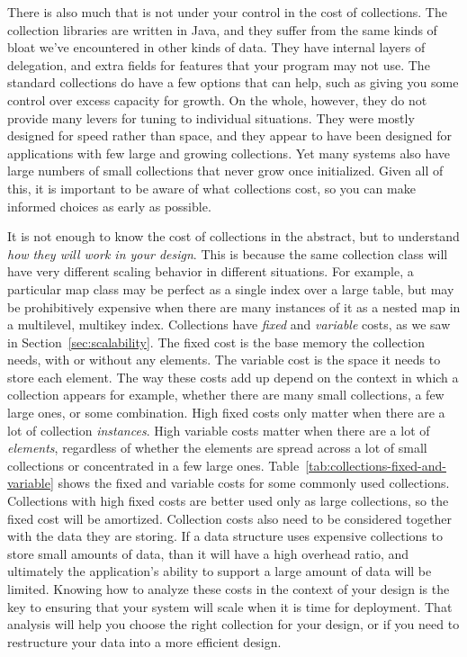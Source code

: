 There is also much that is not under your control in the cost of
collections.
The collection libraries are written in Java, and they suffer
from the same kinds of bloat we've encountered in other kinds of data. They have internal layers of delegation,
and extra fields for features that your program may not use. The standard
collections do have a few options that can help, such as giving you some control over 
excess capacity for growth. On the whole, however, they do not provide many levers for
tuning to individual situations. They were mostly designed for speed rather than space, and
they appear to have been designed for applications with  
few large and growing collections. Yet many systems also have large numbers
of small collections that never grow once initialized. Given all of this, it is important
to be aware of what collections cost, so you can make informed choices as early as possible. 

It is not enough to know the cost of collections in the abstract, but to
understand \emph{how they will work in your design}. This is because the same
collection class will have very different scaling behavior in different
situations. For example, a particular map class may be perfect as a single index
over a large table, but may be prohibitively expensive
when there are many instances of it as a nested map in a multilevel,
multikey index. Collections have \emph{fixed} and \emph{variable} costs, as we saw
in Section~\ref{sec:scalability}. The fixed cost is the base memory
the collection needs, with or without any elements.
The variable cost is the space it needs to store each
element. The way these costs add up
depend on the context in which a collection appears
for example, whether
there are many small collections, a few large ones, or some
combination. High fixed costs only matter when
there are a lot of collection \emph{instances}. High variable costs matter when
there are a lot of \emph{elements}, regardless of whether the elements are
spread across a lot of small collections
or concentrated in a few large ones.
Table~\ref{tab:collections-fixed-and-variable} shows the fixed and variable
costs for some commonly used collections.  %
Collections with high fixed costs are better used only as large collections, so
the fixed cost will be amortized. 
Collection costs also need to be
considered together with the data they are storing. If a data structure uses expensive collections to store small amounts of data, than it
will have a high overhead ratio, and ultimately the application's ability to
support a large amount of data will be limited. Knowing how to analyze these costs
in the context of your design is the key to ensuring that your system will scale when it is time for deployment. That analysis will help you choose the right collection for your
design, or if you need to restructure your data into a more efficient design.

